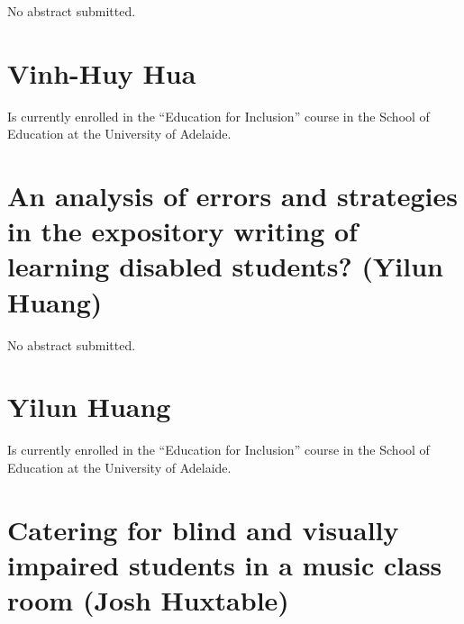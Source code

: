\documentclass[twoside,14pt,a4paper,notitlepage]{memoir}
\begin{document}
No abstract submitted.

\section*{Vinh-Huy Hua}

Is currently enrolled in the ``Education for Inclusion'' course in the School of Education at the University of Adelaide.



\section*{An analysis of errors and strategies in the expository writing of learning disabled students? (Yilun Huang)}
\label{aut:huang}

No abstract submitted.

\section*{Yilun Huang}

Is currently enrolled in the ``Education for Inclusion'' course in the School of Education at the University of Adelaide.



\section*{Catering for blind and visually impaired students in a music class room (Josh Huxtable)}
\label{aut:huxtable}
\end{document}
